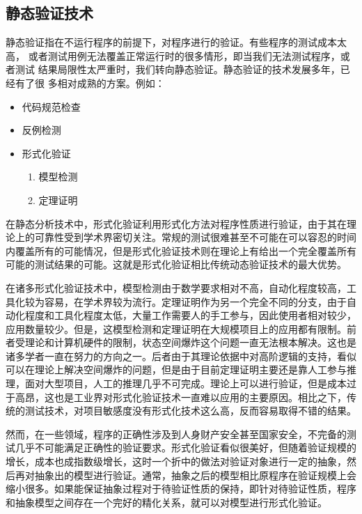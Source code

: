 \subsection{静态验证技术}
\label{subsec:static}
静态验证指在不运行程序的前提下，对程序进行的验证。有些程序的测试成本太高，
或者测试用例无法覆盖正常运行时的很多情形，即当我们无法测试程序，或者测试
结果局限性太严重时，我们转向静态验证。静态验证的技术发展多年，已经有了很
多相对成熟的方案。例如：
\begin{itemize}
	\item 代码规范检查
	\item 反例检测
	\item 形式化验证
	\begin{enumerate}[(1)]
		\item 模型检测
		\item 定理证明
	\end{enumerate}	
\end{itemize}

在静态分析技术中，形式化验证利用形式化方法对程序性质进行验证，由于其在理
论上的可靠性受到学术界密切关注。常规的测试很难甚至不可能在可以容忍的时间
内覆盖所有的可能情况，但是形式化验证技术则在理论上有给出一个完全覆盖所有
可能的测试结果的可能。这就是形式化验证相比传统动态验证技术的最大优势。

在诸多形式化验证技术中，模型检测由于数学要求相对不高，自动化程度较高，工
具化较为容易，在学术界较为流行。定理证明作为另一个完全不同的分支，由于自
动化程度和工具化程度太低，大量工作需要人的手工参与，因此使用者相对较少，
应用数量较少。但是，这模型检测和定理证明在大规模项目上的应用都有限制。前
者受理论和计算机硬件的限制，状态空间爆炸这个问题一直无法根本解决。这也是
诸多学者一直在努力的方向之一。后者由于其理论依据中对高阶逻辑的支持，看似
可以在理论上解决空间爆炸的问题，但是由于目前定理证明主要还是靠人工参与推
理，面对大型项目，人工的推理几乎不可完成。理论上可以进行验证，但是成本过
于高昂，这也是工业界对形式化验证技术一直难以应用的主要原因。相比之下，传
统的测试技术，对项目敏感度没有形式化技术这么高，反而容易取得不错的结果。

然而，在一些领域，程序的正确性涉及到人身财产安全甚至国家安全，不完备的测
试几乎不可能满足正确性的验证要求。形式化验证看似很美好，但随着验证规模的
增长，成本也成指数级增长，这时一个折中的做法对验证对象进行一定的抽象，然
后再对抽象出的模型进行验证。通常，抽象之后的模型相比原程序在验证规模上会
缩小很多。如果能保证抽象过程对于待验证性质的保持，即针对待验证性质，程序
和抽象模型之间存在一个完好的精化关系，就可以对模型进行形式化验证。

